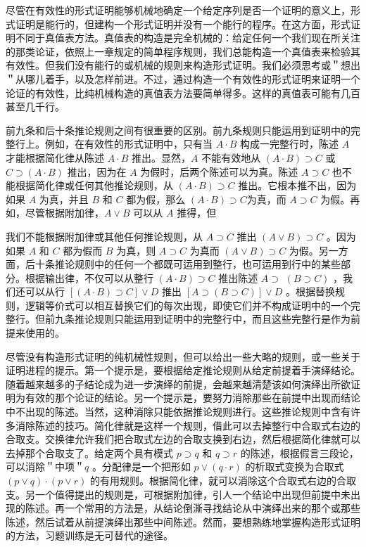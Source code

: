 尽管在有效性的形式证明能够机械地确定一个给定序列是否一个证明的意义上，形式证明是能行的，但建构一个形式证明并没有一个能行的程序。在这方面，形式证明不同于真值表方法。真值表的构造是完全机械的：给定任何一个我们现在所关注的那类论证，依照上一章规定的简单程序规则，我们总能构造一个真值表来检验其有效性。但我们没有能行的或机械的规则来构造形式证明。我们必须思考或＂想出＂从哪儿着手，以及怎样前进。不过，通过构造一个有效性的形式证明来证明一个论证的有效性，比纯机械构造的真值表方法要简单得多。这样的真值表可能有几百甚至几千行。

前九条和后十条推论规则之间有很重要的区别。前九条规则只能运用到证明中的完整行上。例如，在有效性的形式证明中，只有当 $A \cdot B$ 构成一完整行时，陈述 $A$ 才能根据简化律从陈述 $A \cdot B$ 推出。显然，$A$ 不能有效地从 $(A \cdot B) \supset C$ 或 $C \supset(A \cdot B)$ 推出，因为在 $A$ 为假时，后两个陈述可以为真。陈述 $A \supset C$ 也不能根据简化律或任何其他推论规则，从 $(A \cdot B) \supset C$ 推出。它根本推不出，因为如果 $A$ 为真，并且 $B$ 和 $C$ 都为假，那么 $(A \cdot B) \supset C$为真，而 $A \supset C$ 为假。再如，尽管根据附加律，$A \vee B$ 可以从 $A$ 推得，但

我们不能根据附加律或其他任何推论规则，从 $A \supset C$ 推出 $(A \vee B) \supset C$ 。因为如果 $A$ 和 $C$ 都为假而 $B$ 为真，则 $A \supset C$ 为真而 $(A \vee B) \supset C$ 为假。另一方面，后十条推论规则中的任何一个都既可运用到整行，也可运用到行中的某些部分。根据输出律，不仅可以从整行 $(A \cdot B) \supset C$ 推出陈述 $A \supset$ $(B \supset C)$ ，我们还可以从行 $[(A \cdot B) \supset C] \vee D$ 推出 $[A \supset(B \supset C)] \vee D$ 。根据替换规则，逻辑等价式可以相互替换它们的每次出现，即使它们并不构成证明中的一个完整行。但前九条推论规则只能运用到证明中的完整行中，而且这些完整行是作为前提来使用的。

尽管没有构造形式证明的纯机械性规则，但可以给出一些大略的规则，或一些关于证明进程的提示。第一个提示是，要根据给定推论规则从给定前提着手演绎结论。随着越来越多的子结论成为进一步演绎的前提，会越来越清楚该如何演绎出所欲证明为有效的那个论证的结论。另一个提示是，要努力消除那些在前提中出现而结论中不出现的陈述。当然，这种消除只能依据推论规则进行。这些推论规则中含有许多消除陈述的技巧。简化律就是这样一个规则，借此可以去掉整行中合取式右边的合取支。交换律允许我们把合取式左边的合取支换到右边，然后根据简化律就可以去掉那个合取支了。给定两个具有模式 $p \supset q$ 和 $q \supset r$ 的陈述，根据假言三段论，可以消除＂中项＂$q$ 。分配律是一个把形如 $p \vee(q \cdot r)$ 的析取式变换为合取式 $(p \vee q) \cdot(p \vee r)$ 的有用规则。根据简化律，就可以消除这个合取式右边的合取支。另一个值得提出的规则是，可根据附加律，引人一个结论中出现但前提中未出现的陈述。再一个常用的方法是，从结论倒澌寻找结论从中演绎出来的那个或那些陈述，然后试着从前提演绎出那些中间陈述。然而，要想熟练地掌握构造形式证明的方法，习题训练是无可替代的途径。

